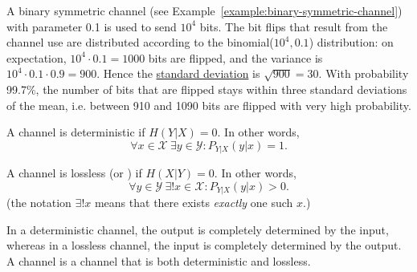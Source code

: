 \begin{example}
A binary symmetric channel (see Example~\ref{example:binary-symmetric-channel}) with parameter 0.1 is used to send $10^4$ bits. The bit flips that result from the channel use are distributed according to the binomial($10^4,0.1$) distribution: on expectation, $10^4 \cdot 0.1 = 1000$ bits are flipped, and the variance is $10^4 \cdot 0.1 \cdot 0.9 = 900$. Hence the \href{https://en.wikipedia.org/wiki/Standard_deviation}{standard deviation} is $\sqrt{900} = 30$. With probability 99.7$\%$, the number of bits that are flipped stays within three standard deviations of the mean, i.e. between 910 and 1090 bits are flipped with very high probability.
\end{example}

\begin{definition}
A channel is deterministic if $H(Y|X) = 0$. In other words,
\[
\forall x \in \mathcal{X}\  \exists y \in \mathcal{Y}: P_{Y|X}(y|x) = 1.
\]
\end{definition}
\begin{definition}
A channel is lossless (or ) if $H(X|Y) = 0$. In other words,
\[
\forall y \in \mathcal{Y}\  \exists! x \in \mathcal{X}: P_{Y|X}(y|x) > 0.
\]
(the notation $\exists!x$ means that there exists \emph{exactly} one such $x$.)
\end{definition}
In a deterministic channel, the output is completely determined by the input, whereas in a lossless channel, the input is completely determined by the output.
A  channel is a channel that is both deterministic and lossless.


